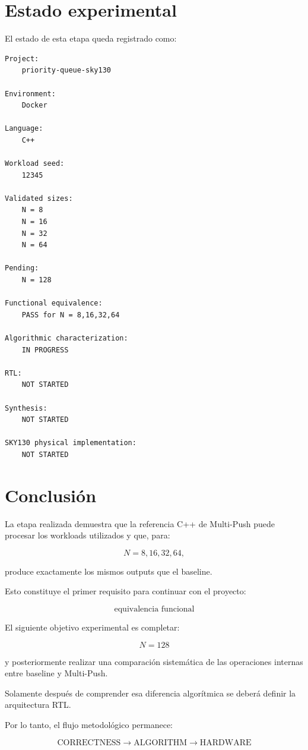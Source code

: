 \documentclass[11pt,a4paper]{article}
\begin{document}
\section{Estado experimental}

El estado de esta etapa queda registrado como:

\begin{lstlisting}[style=textfile]
Project:
    priority-queue-sky130

Environment:
    Docker

Language:
    C++

Workload seed:
    12345

Validated sizes:
    N = 8
    N = 16
    N = 32
    N = 64

Pending:
    N = 128

Functional equivalence:
    PASS for N = 8,16,32,64

Algorithmic characterization:
    IN PROGRESS

RTL:
    NOT STARTED

Synthesis:
    NOT STARTED

SKY130 physical implementation:
    NOT STARTED
\end{lstlisting}

\section{Conclusión}

La etapa realizada demuestra que la referencia C++ de Multi-Push puede
procesar los workloads utilizados y que, para:

\[
N=8,16,32,64,
\]

produce exactamente los mismos outputs que el baseline.

Esto constituye el primer requisito para continuar con el proyecto:

\[
\boxed{
\text{equivalencia funcional}
}
\]

El siguiente objetivo experimental es completar:

\[
N=128
\]

y posteriormente realizar una comparación sistemática de las
operaciones internas entre baseline y Multi-Push.

Solamente después de comprender esa diferencia algorítmica se deberá
definir la arquitectura RTL.

Por lo tanto, el flujo metodológico permanece:

\[
\boxed{
\text{CORRECTNESS}
\rightarrow
\text{ALGORITHM}
\rightarrow
\text{HARDWARE}
}
\]
\end{document}
